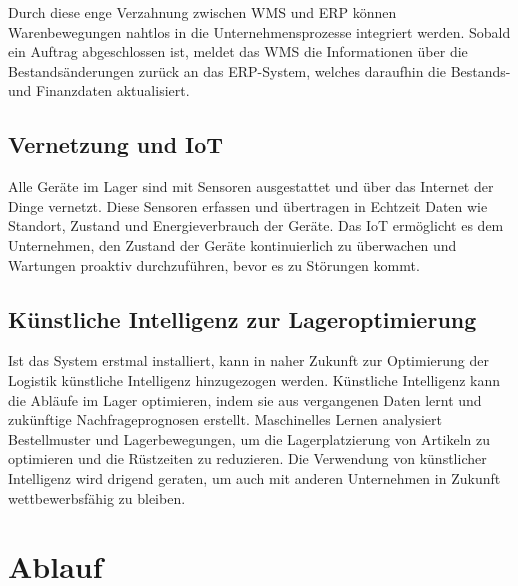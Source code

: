 Durch diese enge Verzahnung zwischen WMS und ERP können Warenbewegungen nahtlos in die Unternehmensprozesse integriert werden. Sobald ein Auftrag abgeschlossen ist, meldet das WMS die Informationen über die Bestandsänderungen zurück an das ERP-System, welches daraufhin die Bestands- und Finanzdaten aktualisiert.

\subsection{Vernetzung und IoT}
 Alle Geräte im Lager sind mit Sensoren ausgestattet und über das Internet der Dinge vernetzt. Diese Sensoren erfassen und übertragen in Echtzeit Daten wie Standort, Zustand und Energieverbrauch der Geräte. Das IoT ermöglicht es dem Unternehmen, den Zustand der Geräte kontinuierlich zu überwachen und Wartungen proaktiv durchzuführen, bevor es zu Störungen kommt.

\subsection{Künstliche Intelligenz zur Lageroptimierung}
Ist das System erstmal installiert, kann in naher Zukunft zur Optimierung der Logistik künstliche Intelligenz hinzugezogen werden. Künstliche Intelligenz kann die Abläufe im Lager optimieren, indem sie aus vergangenen Daten lernt und zukünftige Nachfrageprognosen erstellt. Maschinelles Lernen analysiert Bestellmuster und Lagerbewegungen, um die Lagerplatzierung von Artikeln zu optimieren und die Rüstzeiten zu reduzieren. Die Verwendung von künstlicher Intelligenz wird drigend geraten, um auch mit anderen Unternehmen in Zukunft wettbewerbsfähig zu bleiben.


\section{Ablauf}




